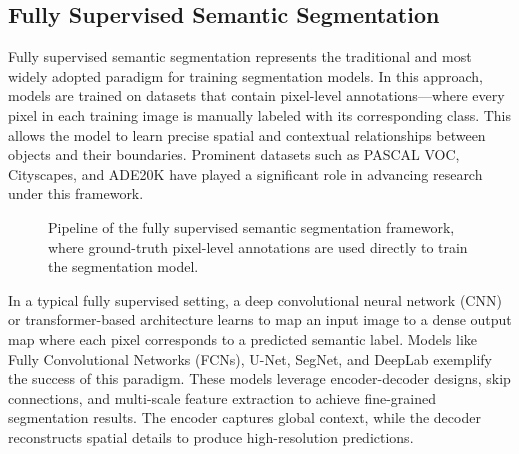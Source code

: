 \subsection{Fully Supervised Semantic Segmentation}
\label{subsec:fully_supervised}
Fully supervised semantic segmentation represents the traditional and most widely adopted paradigm for training segmentation models. In this approach, models are trained on datasets that contain pixel-level annotations—where every pixel in each training image is manually labeled with its corresponding class. This allows the model to learn precise spatial and contextual relationships between objects and their boundaries. Prominent datasets such as PASCAL VOC, Cityscapes, and ADE20K have played a significant role in advancing research under this framework.

\begin{figure}[htbp]
    \centering
    \caption{Pipeline of the fully supervised semantic segmentation framework, where ground-truth pixel-level annotations are used directly to train the segmentation model.}
    \label{fig:fsss}
\end{figure}

In a typical fully supervised setting, a deep convolutional neural network (CNN) or transformer-based architecture learns to map an input image to a dense output map where each pixel corresponds to a predicted semantic label. Models like Fully Convolutional Networks (FCNs), U-Net, SegNet, and DeepLab exemplify the success of this paradigm. These models leverage encoder-decoder designs, skip connections, and multi-scale feature extraction to achieve fine-grained segmentation results. The encoder captures global context, while the decoder reconstructs spatial details to produce high-resolution predictions.

